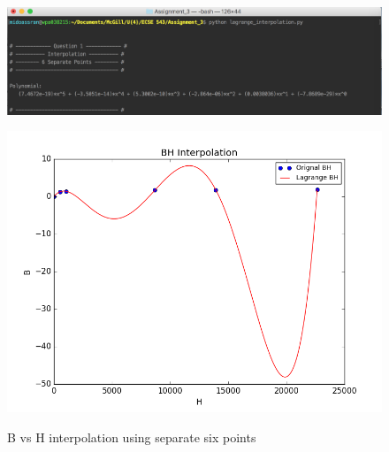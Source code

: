 \documentclass[11pt]{article}
\begin{document}
\begin{figure}[!hbp]
	\begin{center}
		\begin{minipage}{ \textwidth}
			\includegraphics[width= \textwidth]{o_L_BH_sep_six.png}\\
		\end{minipage}
		\begin{minipage}{ \textwidth}
			\includegraphics[width=\textwidth]{L_BH_sep_six.png}\\
		\end{minipage}
		\caption{\label{fig:L_BH_sep_six}B vs H interpolation using separate six points}
	\end{center}
\end{figure}
\end{document}
